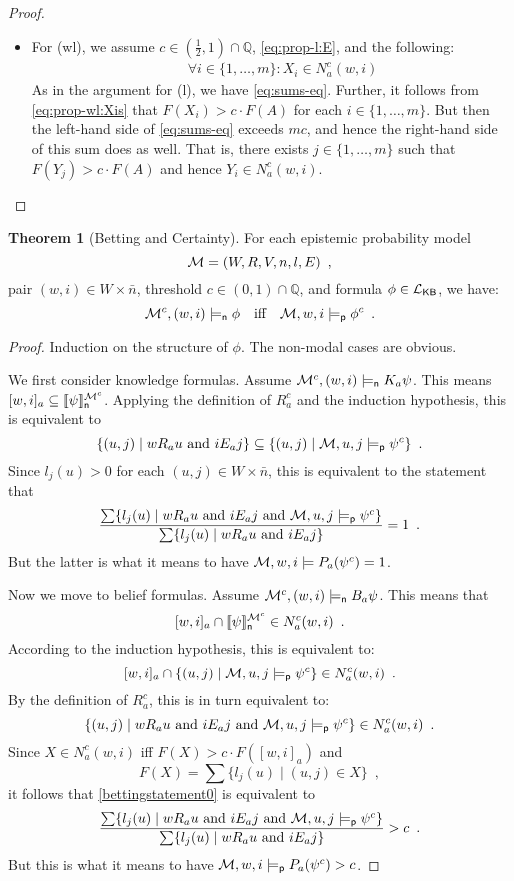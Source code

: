 \documentclass[12pt]{article}
\theoremstyle{definition}
\newtheorem{theorem}{Theorem}[section]
\newcommand{\Rat}{\mathbb{Q}}  %
\newcommand{\M}{{\cal M}}      %
\newcommand{\Lang}{{\cal L}}   %
\newcommand{\KB}{{\mathsf{KB}}}                     %
\newcommand{\modelsn}{\models_{\mathsf{n}}}                  %
\newcommand{\semn}[1]{\llbracket{#1}\rrbracket_{\mathsf{n}}} %
\newcommand{\modelsp}{\models_{\mathsf{p}}}                  %
\begin{document}
\begin{proof}
\begin{itemize}
  \item For (wl), we assume $c\in(\frac 12,1)\cap\Rat$,
    \eqref{eq:prop-l:E}, and the following:
    \begin{eqnarray}
      &&
      \forall i\in\{1,\dots,m\}: X_i\in N^c_a(w,i)
      \label{eq:prop-wl:Xis}
    \end{eqnarray}
    As in the argument for (l), we have \eqref{eq:sums-eq}.  Further,
    it follows from \eqref{eq:prop-wl:Xis} that $F(X_i)>c\cdot F(A)$
    for each $i\in\{1,\dots,m\}$.  But then the left-hand side of
    \eqref{eq:sums-eq} exceeds $mc$, and hence the right-hand side of
    this sum does as well. That is, there exists $j\in\{1,\dots,m\}$
    such that $F(Y_j)>c\cdot F(A)$ and hence $Y_i\in N^c_a(w,i)$.
    \qedhere
  \end{itemize}
\end{proof}

\begin{theorem}[Betting and Certainty]
  \label{BettingTheorem}
  For each epistemic probability model
  \[
  \M = (W,R,V,n,l,E)\enspace,
  \]
  pair $(w,i)\in W\times\bar{n}$, threshold $c\in(0,1)\cap\Rat$, and
  formula $\phi \in \Lang_\KB$, we have:
  \[
  \M^c,(w,i)\modelsn\phi \quad\text{iff}\quad \M,w,i\modelsp\phi^c
  \enspace.
  \]
\end{theorem}
\begin{proof}
  Induction on the structure of $\phi$. The non-modal cases are
  obvious.

  We first consider knowledge formulas. Assume $\M^c,(w,i)\modelsn
  K_a\psi$.  This means
  $[w,i]_a\subseteq\semn{\psi}^{\M^c}$. Applying the definition of
  $R^c_a$ and the induction hypothesis, this is equivalent to
  \[
  \{(u,j)\mid wR_au \text{ and } iE_aj\}\subseteq \{(u,j)\mid
  \M,u,j\modelsp \psi^c\} \enspace.
  \]
  Since $l_j(u)>0$ for each $(u,j)\in W\times\bar{n}$, this is
  equivalent to the statement that
  \[
  \frac{\sum\{l_j(u)\mid wR_au \text{ and } iE_aj\text{ and }
    \M,u,j\modelsp \psi^c\}} {\sum\{l_j(u)\mid wR_au\text{ and }
    iE_aj\}} = 1 \enspace.
  \]
  But the latter is what it means to have $\M,w,i\models
  P_a(\psi^c)=1$.

  Now we move to belief formulas. Assume $\M^c,(w,i)\modelsn
  B_a\psi$.  This means that
  \[
  [w,i]_a\cap\semn{\psi}^{\M^c}\in N^c_a(w,i) \enspace.
  \]
  According to the induction hypothesis, this is equivalent to: 
  \[
  [w,i]_a\cap \{(u,j)\mid \M,u,j\modelsp \psi^c\}\in N^c_a(w,i)
  \enspace.
  \]
  By the definition of $R^c_a$, this is in turn equivalent to:
  \begin{equation}
    \{(u,j)\mid wR_au \text{ and } iE_aj \text{ and } \M,u,j\modelsp\psi^c\}\in
    N^c_a(w,i) \enspace.
  \label{bettingstatement0}
  \end{equation}
  Since $X\in N^c_a(w,i)$ iff $F(X)> c\cdot F([w,i]_a)$ and
  \[
    F(X) = \sum \{l_j(u) \mid (u,j)\in X\} \enspace,
  \]
  it follows that \eqref{bettingstatement0} is equivalent to
  \[
  \frac{\sum\{l_j(u)\mid wR_au \text{ and } iE_aj\text{ and }
    \M,u,j\modelsp\psi^c\}} {\sum\{l_j(u)\mid wR_au\text{ and }
    iE_aj\}} > c \enspace.
  \]
  But this is what it means to have $\M,w,i\modelsp P_a(\psi^c)>c$.
\end{proof}
\end{document}
